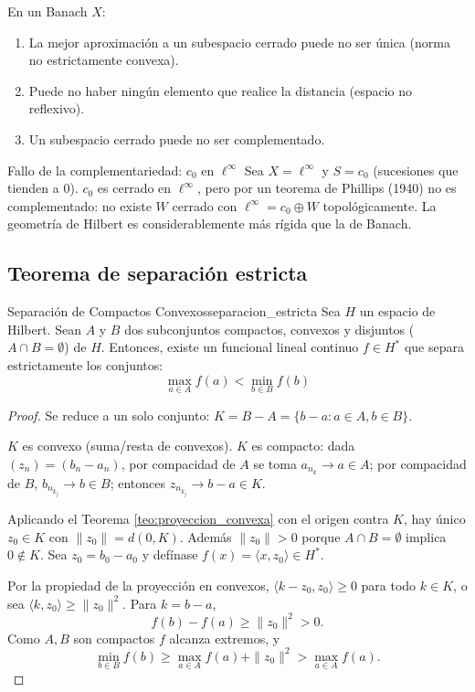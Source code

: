 \documentclass[11pt, a4paper]{article}
\begin{document}
\obs En un Banach $X$:
\begin{enumerate}
    \item La mejor aproximación a un subespacio cerrado puede no ser única (norma no
    estrictamente convexa).
    \item Puede no haber ningún elemento que realice la distancia (espacio no reflexivo).
    \item Un subespacio cerrado puede no ser complementado.
\end{enumerate}


\begin{ejemplo}{Fallo de la complementariedad: $c_0$ en $\ell^\infty$}{}
Sea $X = \ell^\infty$ y $S = c_0$ (sucesiones que tienden a 0). $c_0$ es cerrado en $\ell^\infty$,
pero por un teorema de Phillips (1940) no es complementado: no existe $W$ cerrado con
$\ell^\infty = c_0 \oplus W$ topológicamente. La geometría de Hilbert es considerablemente más
rígida que la de Banach.
\end{ejemplo}

\subsection{Teorema de separación estricta}

\begin{teorema}{Separación de Compactos Convexos}{separacion_estricta}
Sea $H$ un espacio de Hilbert. Sean $A$ y $B$ dos subconjuntos compactos, convexos y disjuntos
($A \cap B = \emptyset$) de $H$.
Entonces, existe un funcional lineal continuo $f \in H^*$ que separa estrictamente los conjuntos:
$$ \max_{a \in A} f(a) < \min_{b \in B} f(b) $$
\end{teorema}

\begin{proof}
Se reduce a un solo conjunto: $K = B - A = \{b - a : a \in A, b \in B\}$.

$K$ es convexo (suma/resta de convexos). $K$ es compacto: dada $(z_n) = (b_n - a_n)$, por compacidad
de $A$ se toma $a_{n_k} \to a \in A$; por compacidad de $B$, $b_{n_{k_j}} \to b \in B$; entonces
$z_{n_{k_j}} \to b - a \in K$.

Aplicando el Teorema \ref{teo:proyeccion_convexa} con el origen contra $K$, hay único $z_0 \in K$ con
$\|z_0\| = d(0, K)$. Además $\|z_0\| > 0$ porque $A \cap B = \emptyset$ implica $0 \notin K$. Sea
$z_0 = b_0 - a_0$ y defínase $f(x) = \langle x, z_0 \rangle \in H^*$.

Por la propiedad de la proyección en convexos, $\langle k - z_0, z_0 \rangle \ge 0$ para todo
$k \in K$, o sea $\langle k, z_0 \rangle \ge \|z_0\|^2$. Para $k = b - a$,
$$ f(b) - f(a) \ge \|z_0\|^2 > 0. $$
Como $A, B$ son compactos $f$ alcanza extremos, y
$$ \min_{b \in B} f(b) \ge \max_{a \in A} f(a) + \|z_0\|^2 > \max_{a \in A} f(a). $$
\end{proof}
\end{document}
